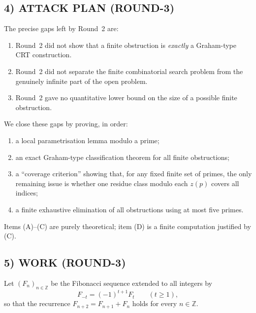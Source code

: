 \subsection*{4) ATTACK PLAN (ROUND-3)}
The precise gaps left by Round~2 are:
\begin{enumerate}
\item Round~2 did not show that a finite obstruction is \emph{exactly} a Graham-type CRT construction.
\item Round~2 did not separate the finite combinatorial search problem from the genuinely infinite part of the open problem.
\item Round~2 gave no quantitative lower bound on the size of a possible finite obstruction.
\end{enumerate}
We close these gaps by proving, in order:
\begin{enumerate}
\item[(A)] a local parametrisation lemma modulo a prime;
\item[(B)] an exact Graham-type classification theorem for all finite obstructions;
\item[(C)] a ``coverage criterion'' showing that, for any fixed finite set of primes, the only remaining issue is whether one residue class modulo each $z(p)$ covers all indices;
\item[(D)] a finite exhaustive elimination of all obstructions using at most five primes.
\end{enumerate}
Items (A)--(C) are purely theoretical; item (D) is a finite computation justified by (C).

\subsection*{5) WORK (ROUND-3)}
Let $(F_n)_{n\in \mathbb Z}$ be the Fibonacci sequence extended to all integers by
\[
F_{-t}=(-1)^{t+1}F_t \qquad (t\ge 1),
\]
so that the recurrence $F_{n+2}=F_{n+1}+F_n$ holds for every $n\in\mathbb Z$.

